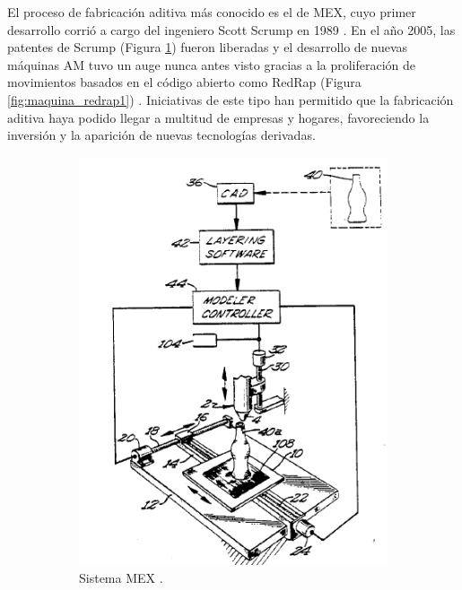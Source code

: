 El proceso de fabricación aditiva más conocido es el de \acrfull{MEX}, cuyo primer desarrollo corrió a cargo del ingeniero Scott Scrump en 1989 \cite{Scrump1989}. En el año 2005, las patentes de Scrump (Figura \ref{fig:patente_scrump}) fueron liberadas y el desarrollo de nuevas máquinas \acrshort{AM} tuvo un auge nunca antes visto gracias a la proliferación de movimientos basados en el código abierto como RedRap (Figura \ref{fig:maquina_redrap1}) \cite{web_RedRap}. Iniciativas de este tipo han permitido que la fabricación aditiva haya podido llegar a multitud de empresas y hogares, favoreciendo la inversión y la aparición de nuevas tecnologías derivadas.

\begin{figure}[h!]
    \centering
    \begin{subfigure}[h]{0.45\linewidth} 
        \centering
        \includegraphics[scale=0.38]{figuras/patente_scrump.png}
        \caption{Sistema \acrshort{MEX} \cite{Scrump1989}.}
        \label{fig:patente_scrump}
    \end{subfigure}
    \begin{subfigure}[h]{0.45\linewidth} 
        \centering

\end{subfigure}
\end{figure}
